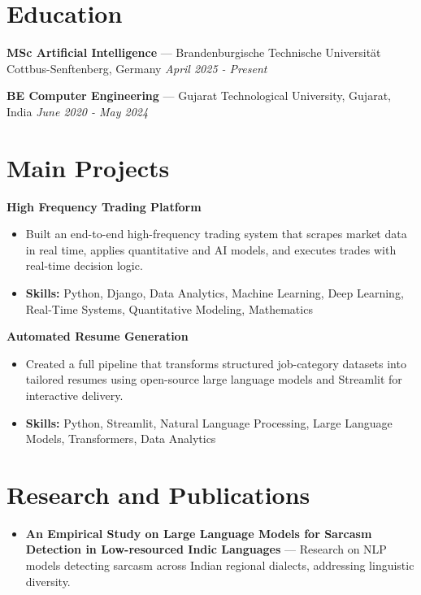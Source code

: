 \documentclass[a4paper,10pt]{article}
\begin{document}
\section*{Education}
\textbf{MSc Artificial Intelligence} — Brandenburgische Technische Universität Cottbus-Senftenberg, Germany \hfill \textit{April 2025 - Present}\par
\vspace{1.5pt}
\textbf{BE Computer Engineering} — Gujarat Technological University, Gujarat, India \hfill \textit{June 2020 - May 2024}\par

\section*{Main Projects}
\textbf{High Frequency Trading Platform}\par
\vspace{1pt}
\begin{itemize}
  \item Built an end-to-end high-frequency trading system that scrapes market data in real time, applies quantitative and AI models, and executes trades with real-time decision logic.
  \item \textbf{Skills:} Python, Django, Data Analytics, Machine Learning, Deep Learning, Real-Time Systems, Quantitative Modeling, Mathematics
\end{itemize}
\vspace{3pt}
\textbf{Automated Resume Generation}\par
\vspace{1pt}
\begin{itemize}
  \item Created a full pipeline that transforms structured job-category datasets into tailored resumes using open-source large language models and Streamlit for interactive delivery.
  \item \textbf{Skills:} Python, Streamlit, Natural Language Processing, Large Language Models, Transformers, Data Analytics
\end{itemize}

\section*{Research and Publications}
\begin{itemize}
\item \textbf{An Empirical Study on Large Language Models for Sarcasm Detection in Low-resourced Indic Languages} — Research on NLP models detecting sarcasm across Indian regional dialects, addressing linguistic diversity.
\end{itemize}
\end{document}
